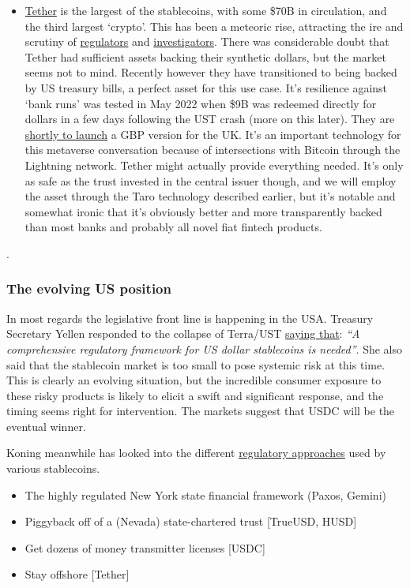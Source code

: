 \begin{itemize}
\item \href{https://tether.to/en/whitepaper/}{Tether} is the largest of the stablecoins, with some \$70B in circulation, and the third largest `crypto'. This has been a meteoric rise, attracting the ire and scrutiny of \href{https://www.cftc.gov/PressRoom/PressReleases/8450-21}{regulators} and \href{https://www.bloomberg.com/news/features/2021-10-07/crypto-mystery-where-s-the-69-billion-backing-the-stablecoin-tether}{investigators}. There was considerable doubt that Tether had sufficient assets backing their synthetic dollars, but the market seems not to mind. Recently however they have transitioned to being backed by US treasury bills, a perfect asset for this use case. It's resilience against `bank runs' was tested in May 2022 when \$9B was redeemed directly for dollars in a few days following the UST crash (more on this later). They are \href{https://tether.to/en/tether-to-launch-gbpt-tether-tokens-pegged-to-the-british-pound-sterling/}{shortly to launch} a GBP version for the UK. It's an important technology for this metaverse conversation because of intersections with Bitcoin through the Lightning network. Tether might actually provide everything needed. It's only as safe as the trust invested in the central issuer though, and we will employ the asset through the Taro technology described earlier, but it's notable and somewhat ironic that it's obviously better and more transparently backed than most banks and probably all novel fiat fintech products.
\end{itemize}  .
\subsubsection{The evolving US position}
In most regards the legislative front line is happening in the USA. Treasury Secretary Yellen responded to the collapse of Terra/UST \href{https://www.youtube.com/watch?v=kU0xYBRfgvU}{saying that}: \textit{``A comprehensive regulatory framework for US dollar stablecoins is needed''}. She also said that the stablecoin market is too small to pose systemic risk at this time. This is clearly an evolving situation, but the incredible consumer exposure to these risky products is likely to elicit a swift and significant response, and the timing seems right for intervention. The markets suggest that USDC will be the eventual winner.\par Koning meanwhile has looked into the different \href{http://jpkoning.blogspot.com/2021/08/stablecoin-regulatory-strategies.html}{regulatory approaches} used by various stablecoins.\par
\begin{itemize}
\item The highly regulated New York state financial framework (Paxos, Gemini)
\item Piggyback off of a (Nevada) state-chartered trust [TrueUSD, HUSD]
\item Get dozens of money transmitter licenses [USDC]
\item Stay offshore [Tether]
\end{itemize}

